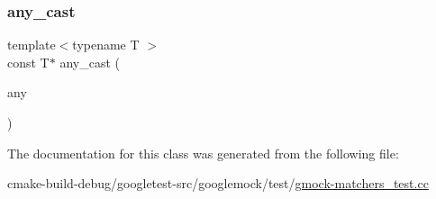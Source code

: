 \subsubsection{\texorpdfstring{any\_cast}{any\_cast}}
{\footnotesize\ttfamily template$<$typename T $>$ \\
const T$\ast$ any\+\_\+cast (\begin{DoxyParamCaption}\item[{const \mbox{\hyperlink{classtesting_1_1gmock__matchers__test_1_1SampleAnyType}{Sample\+Any\+Type}} $\ast$}]{any }\end{DoxyParamCaption})\hspace{0.3cm}{\ttfamily [friend]}}



The documentation for this class was generated from the following file\+:\begin{DoxyCompactItemize}
\item 
cmake-\/build-\/debug/googletest-\/src/googlemock/test/\mbox{\hyperlink{gmock-matchers__test_8cc}{gmock-\/matchers\+\_\+test.\+cc}}\end{DoxyCompactItemize}
